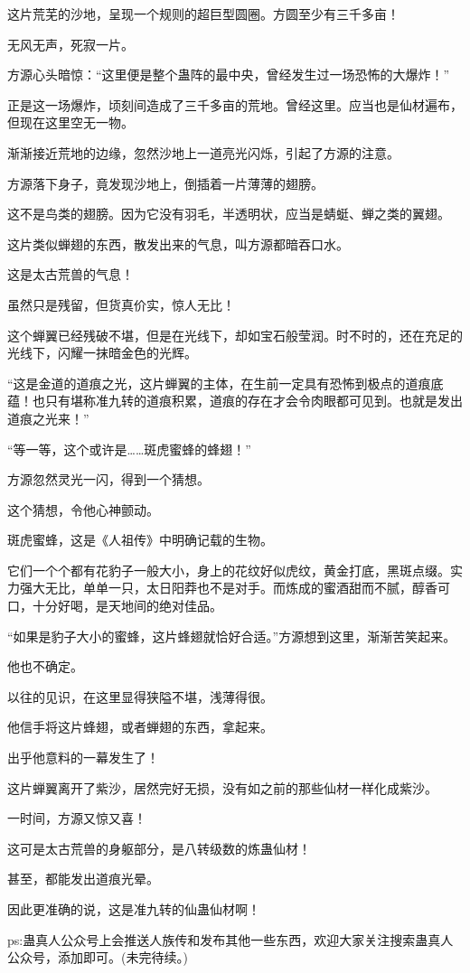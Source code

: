 \begin{this_body}
这片荒芜的沙地，呈现一个规则的超巨型圆圈。方圆至少有三千多亩！

无风无声，死寂一片。

方源心头暗惊：“这里便是整个蛊阵的最中央，曾经发生过一场恐怖的大爆炸！”

正是这一场爆炸，顷刻间造成了三千多亩的荒地。曾经这里。应当也是仙材遍布，但现在这里空无一物。

渐渐接近荒地的边缘，忽然沙地上一道亮光闪烁，引起了方源的注意。

方源落下身子，竟发现沙地上，倒插着一片薄薄的翅膀。

这不是鸟类的翅膀。因为它没有羽毛，半透明状，应当是蜻蜓、蝉之类的翼翅。

这片类似蝉翅的东西，散发出来的气息，叫方源都暗吞口水。

这是太古荒兽的气息！

虽然只是残留，但货真价实，惊人无比！

这个蝉翼已经残破不堪，但是在光线下，却如宝石般莹润。时不时的，还在充足的光线下，闪耀一抹暗金色的光辉。

“这是金道的道痕之光，这片蝉翼的主体，在生前一定具有恐怖到极点的道痕底蕴！也只有堪称准九转的道痕积累，道痕的存在才会令肉眼都可见到。也就是发出道痕之光来！”

“等一等，这个或许是……斑虎蜜蜂的蜂翅！”

方源忽然灵光一闪，得到一个猜想。

这个猜想，令他心神颤动。

斑虎蜜蜂，这是《人祖传》中明确记载的生物。

它们一个个都有花豹子一般大小，身上的花纹好似虎纹，黄金打底，黑斑点缀。实力强大无比，单单一只，太日阳莽也不是对手。而炼成的蜜酒甜而不腻，醇香可口，十分好喝，是天地间的绝对佳品。

“如果是豹子大小的蜜蜂，这片蜂翅就恰好合适。”方源想到这里，渐渐苦笑起来。

他也不确定。

以往的见识，在这里显得狭隘不堪，浅薄得很。

他信手将这片蜂翅，或者蝉翅的东西，拿起来。

出乎他意料的一幕发生了！

这片蝉翼离开了紫沙，居然完好无损，没有如之前的那些仙材一样化成紫沙。

一时间，方源又惊又喜！

这可是太古荒兽的身躯部分，是八转级数的炼蛊仙材！

甚至，都能发出道痕光晕。

因此更准确的说，这是准九转的仙蛊仙材啊！

ps:蛊真人公众号上会推送人族传和发布其他一些东西，欢迎大家关注搜索蛊真人公众号，添加即可。(未完待续。)

\end{this_body}

